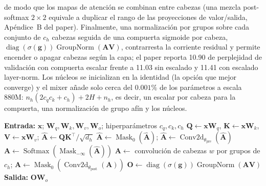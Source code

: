 de modo que los mapas de atención se combinan entre cabezas (una mezcla post-softmax $2\times2$ equivale a duplicar el rango de las proyecciones de valor/salida, Apéndice~B del paper). Finalmente, una normalización por grupos sobre cada conjunto de $c_h$ cabezas seguida de una compuerta sigmoide por cabeza, $\operatorname{diag}(\sigma(\mathbf{g}))\operatorname{GroupNorm}(\mathbf{A}\mathbf{V})$, contrarresta la corriente residual y permite encender o apagar cabezas según la capa; el paper reporta 10.90 de perplejidad de validación con compuerta escalar frente a 11.03 sin escalado y 11.41 con escalado layer-norm. Los núcleos se inicializan en la identidad (la opción que mejor converge) y el mixer añade solo cerca del $0.001\%$ de los parámetros a escala 880M: $n_h(2c_qc_k + c_h) + 2H + n_h$, es decir, un escalar por cabeza para la compuerta, una normalización de grupo afín y los núcleos.

\begin{algorithmic}[1]
\State \textbf{Entrada:} $\mathbf{x}$; $\mathbf{W}_q,\mathbf{W}_k,\mathbf{W}_v,\mathbf{W}_o$; hiperparámetros $c_q,c_k,c_h$
\State $\mathbf{Q}\gets\mathbf{x}\mathbf{W}_q$, $\mathbf{K}\gets\mathbf{x}\mathbf{W}_k$, $\mathbf{V}\gets\mathbf{x}\mathbf{W}_v$; $\hat{\mathbf{A}}\gets\mathbf{Q}\mathbf{K}^\top/\sqrt{d_h}$
\State $\hat{\mathbf{A}}\gets\operatorname{Mask}_{0}(\hat{\mathbf{A}})$; \quad $\hat{\mathbf{A}}\gets\operatorname{Conv2d}_{\theta_{\text{pre}}}(\hat{\mathbf{A}})$
\State $\mathbf{A}\gets\operatorname{Softmax}(\operatorname{Mask}_{-\infty}(\hat{\mathbf{A}}))$
\State $\mathbf{A}\gets$ convolución de cabezas $w$ por grupos de $c_h$; \quad $\mathbf{A}\gets\operatorname{Mask}_{0}(\operatorname{Conv2d}_{\theta_{\text{post}}}(\mathbf{A}))$
\State $\mathbf{O}\gets\operatorname{diag}(\sigma(\mathbf{g}))\operatorname{GroupNorm}(\mathbf{A}\mathbf{V})$
\State \textbf{Salida:} $\mathbf{O}\mathbf{W}_o$
\end{algorithmic}

